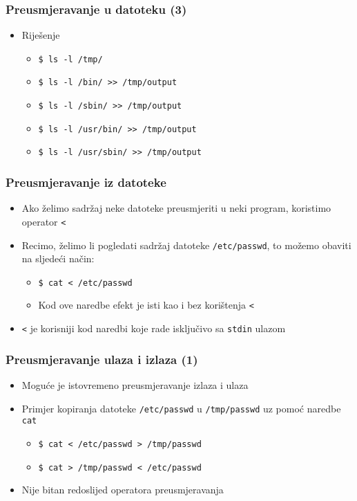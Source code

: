 \documentclass{beamer}
\newcommand{\shell}[1]{\texttt{#1}}
\begin{document}
\begin{frame}[t]
\frametitle{Preusmjeravanje u datoteku (3)}
\begin{itemize}
	\item Riješenje
	\begin{itemize}
	
	\item[] \shell{\$ ls -l /tmp/}
	\item[] \shell{\$ ls -l /bin/ >> /tmp/output}
	\item[] \shell{\$ ls -l /sbin/ >> /tmp/output}
	\item[] \shell{\$ ls -l /usr/bin/ >> /tmp/output}
	\item[] \shell{\$ ls -l /usr/sbin/ >> /tmp/output}

	\end{itemize}
\end{itemize}
\end{frame}


\begin{frame}[t]
\frametitle{Preusmjeravanje iz datoteke}
\begin{itemize}
  \item Ako želimo sadržaj neke datoteke preusmjeriti u neki program, 
        koristimo operator \shell{<}
  \item Recimo, želimo li pogledati sadržaj datoteke \shell{/etc/passwd},
        to možemo obaviti na sljedeći način:
  \begin{itemize}
    \item[] \shell{\$ cat < /etc/passwd}
    \item[] {\small Kod ove naredbe efekt je isti kao i bez korištenja \shell{<}}
  \end{itemize}
	\item \shell{<} je korisniji kod naredbi koje rade isključivo sa \shell{stdin} ulazom
\end{itemize}
\end{frame}

\begin{frame}[t]
\frametitle{Preusmjeravanje ulaza i izlaza (1)}
\begin{itemize}
  \item Moguće je istovremeno preusmjeravanje izlaza i ulaza
  \item Primjer kopiranja datoteke \shell{/etc/passwd} u 
        \shell{/tmp/passwd} uz pomoć naredbe \shell{cat}
  \begin{itemize}
    \item[] \shell{\$ cat < /etc/passwd > /tmp/passwd}
    \item[] \shell{\$ cat > /tmp/passwd < /etc/passwd}
  \end{itemize}
  \item Nije bitan redoslijed operatora preusmjeravanja
\end{itemize}
\end{frame}
\end{document}
